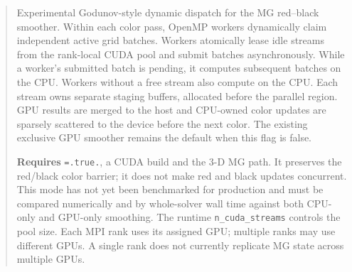 \label{param:mg_dynamic_hybrid}

\begin{quote}
Experimental Godunov-style dynamic dispatch for the MG red--black smoother.
Within each color pass, OpenMP workers dynamically claim independent active
grid batches. Workers atomically lease idle streams from the rank-local CUDA
pool and submit batches asynchronously. While a worker's submitted batch is
pending, it computes subsequent batches on the CPU. Workers without a free
stream also compute on the CPU. Each stream owns separate staging buffers,
allocated before the parallel region. GPU results
are merged to the host and CPU-owned color updates are sparsely scattered to
the device before the next color. The existing exclusive GPU smoother remains
the default when this flag is false.

\textbf{Requires} \texttt{=.true.}, a CUDA build and
the 3-D MG path. It preserves the red/black color barrier; it does not make
red and black updates concurrent. This mode has not yet been benchmarked for
production and must be compared numerically and by whole-solver wall time
against both CPU-only and GPU-only smoothing.
The runtime \texttt{n\_cuda\_streams} controls the pool size. Each MPI rank
uses its assigned GPU; multiple ranks may use different GPUs. A single rank
does not currently replicate MG state across multiple GPUs.
\end{quote}

\label{param:gpu_fft}

